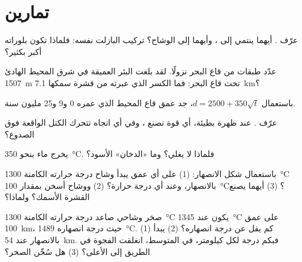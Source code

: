 \section{تمارين}

\begin{exercise}[$\star$]\label{exo:g11:ocean-ridges:1}
عرّف  . أيهما ينتمي إلى ،
وأيهما إلى الوشاح؟  تركيب البازلت نفسه: فلماذا تكون
بلوراته أكبر بكثير؟
\end{exercise}

\begin{exercise}[$\star$]\label{exo:g11:ocean-ridges:2}
عدّد طبقات  من قاع البحر نزولًا. لقد بلغت البئر العميقة
في شرق المحيط الهادئ \qty{1507}{m} تحت قاع البحر: فما
الكسر الذي عبرته من قشرة سمكها \qty{7.1}{km}؟
\end{exercise}

\begin{exercise}[$\star$]\label{exo:g11:ocean-ridges:3}
باستعمال $d = 2500 + 350\sqrt{t}$، جد عمق قاع المحيط الذي عمره 0 و9 و25
مليون سنة.
\end{exercise}

\begin{exercise}[$\star$]\label{exo:g11:ocean-ridges:4}
عرّف . عند ظهرة بطيئة، أي قوة تصنع ،
وفي أي اتجاه تتحرك الكتل الواقعة فوق الصدوع؟
\end{exercise}

\begin{exercise}[$\star$]\label{exo:g11:ocean-ridges:5}
يخرج ماء  بنحو \qty{350}{\celsius}. فلماذا لا
يغلي؟ وما «الدخان» الأسود؟
\end{exercise}

\begin{exercise}[$\star\star$]\label{exo:g11:ocean-ridges:6}
باستعمال شكل الانصهار: (1) على أي عمق يبدأ وشاح درجة حرارته الكامنة
\qty{1300}{\celsius} بالانصهار، وعند أي درجة حرارة؟ (2)
ووشاح أسخن بمقدار \qty{100}{\celsius}؟ (3) أيهما يصنع
القشرة الأسمك؟ ولماذا؟
\end{exercise}

\begin{exercise}[$\star\star$]\label{exo:g11:ocean-ridges:7}
صخر وشاحي صاعد درجة حرارته الكامنة \qty{1300}{\celsius} يكون عند
\qty{1345}{\celsius} على عمق \qty{100}{km}، حيث درجة انصهاره
\qty{1489}{\celsius}. (1) كم يقل عن درجة
انصهاره؟ (2) يبدأ بالانصهار عند \qty{54}{km}. فبكم درجة
لكل كيلومتر، في المتوسط، انغلقت الفجوة في الطريق إلى الأعلى؟ (3) هل
سُخّن الصخر؟
\end{exercise}

